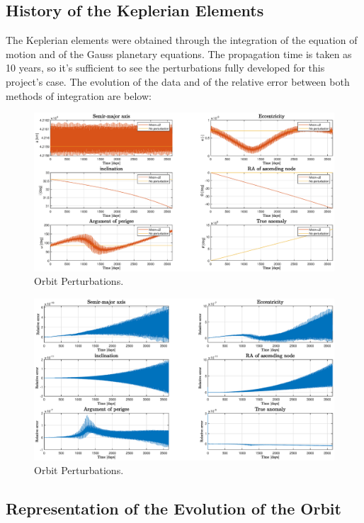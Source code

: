 \documentclass{article}
\begin{document}
\subsection{History of the Keplerian Elements} 

The Keplerian elements were obtained through the integration of the equation of motion and 
of the Gauss planetary equations. The propagation time is taken as 10 years, so it's sufficient to see the perturbations fully developed for this project's case. The evolution of the data and of the relative error between both methods of integration are below:

\begin{figure}[H]
	\centering
	\includegraphics[width=1\textwidth]{orbitprop10yrs.eps}
	\caption{Orbit Perturbations.}
	\label{fig:orbitprop10yrs}
\end{figure}

\begin{figure}[H]
	\centering
	\includegraphics[width=1\textwidth]{relative_error10yrs.eps}
	\caption{Orbit Perturbations.}
	\label{fig:relative_error10yrs}
\end{figure}

\subsection{Representation of the Evolution of the Orbit} 
\end{document}
